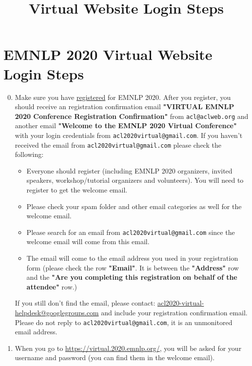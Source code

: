 \documentclass[11pt]{scrartcl}
\title{\conferenceName Virtual Website Login Steps}
\makeatletter
\newcommand{\conferenceName}{EMNLP 2020\xspace}
\newcommand{\registrationUrl}{https://aclweb.org/conference/virtual-emnlp-2020-conference-registration/}
\newcommand{\virtualConferenceUrl}{https://virtual.2020.emnlp.org/}
\newcommand{\loginCredentialEmail}{acl2020virtual@gmail.com}
\newcommand{\helpdeskEmail}{acl2020-virtual-helpdesk@googlegroups.com}
\makeatother
\begin{document}
\section*{\conferenceName Virtual Website Login Steps}
	
\begin{enumerate}
	\setcounter{enumi}{-1}
	\item
		\label{step:registration}
		\begin{sloppypar}
			Make sure you have \href{\registrationUrl}{registered} for \conferenceName. After you register, you should receive an registration confirmation email \textbf{"VIRTUAL \conferenceName Conference Registration Confirmation"} from \nolinkurl{acl@aclweb.org} and another email \textbf{"Welcome to the \conferenceName Virtual Conference"} with your login credentials from \nolinkurl{\loginCredentialEmail}. If you haven't received the email from \nolinkurl{\loginCredentialEmail} please check the following:
			
			\begin{itemize}
				\item Everyone should register (including \conferenceName organizers, invited speakers, workshop/tutorial organizers and volunteers). You will need to register to get the welcome email.
				\item Please check your spam folder and other email categories as well for the welcome email.
				\item Please search for an email from \nolinkurl{\loginCredentialEmail} since the welcome email will come from this email.
				\item The email will come to the email address you used in your registration form (please check the row \textbf{"Email"}. It is between the \textbf{"Address"} row and the \textbf{"Are you completing this registration on behalf of the attendee"} row.)
			\end{itemize}
		
			If you still don't find the email, please contact: \href{mailto:\helpdeskEmail}{\helpdeskEmail} and include your registration confirmation email. Please do not reply to \nolinkurl{\loginCredentialEmail}, it is an unmonitored email address.
		\end{sloppypar}
	\item
		\begin{sloppypar}
			When you go to \url{\virtualConferenceUrl}, you will be asked for your username and password (you can find them in the welcome email).
			

\end{sloppypar}
\end{enumerate}
\end{document}
